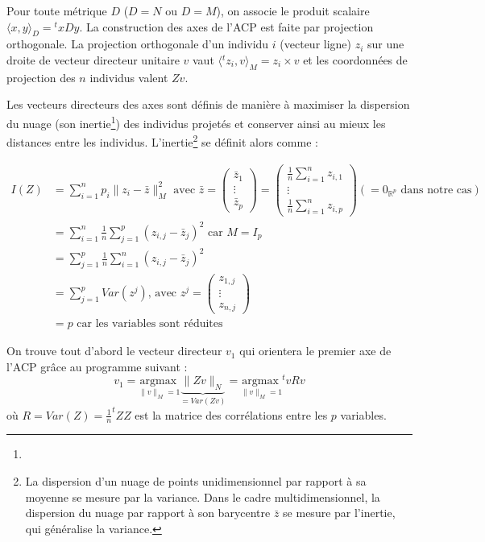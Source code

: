 \documentclass[11pt,french,french]{article}
\let\rmarkdownfootnote\footnote%
\def\footnote{\protect\rmarkdownfootnote}
\begin{document}
Pour toute métrique \(D\) (\(D=N\) ou \(D=M\)), on associe le produit scalaire \(\langle x,y\rangle_{D} = {}^t\!xD y\).
La construction des axes de l'ACP est faite par projection orthogonale.
La projection orthogonale d'un individu \(i\) (vecteur ligne) \(z_i\) sur une droite de vecteur directeur unitaire \(v\) vaut \(\langle {}^tz_i,v\rangle_{M}=z_i\times v\) et les coordonnées de projection des \(n\) individus valent \(Zv\).

Les vecteurs directeurs des axes sont définis de manière à maximiser la dispersion du nuage (son inertie\footnote{}) des individus projetés et conserver ainsi au mieux les distances entre les individus. L'inertie\footnote{La dispersion d'un nuage de points unidimensionnel par rapport à sa moyenne se mesure par la variance. Dans le cadre multidimensionnel, la dispersion du nuage par rapport à son barycentre \(\bar z\) se mesure par l'inertie, qui généralise la variance.} se définit alors comme :

\begin{align*}
I(Z) &= \sum_{i = 1}^n p_i\|z_i-\bar{z}\|_M^2 \text{ avec }
  \bar{z} = 
  \begin{pmatrix}\bar z_{1} \\
    \vdots \\ \bar z_{p}
  \end{pmatrix} =
  \begin{pmatrix}\frac 1 n \sum_{i=1}^n z_{i,1} \\
    \vdots \\ \frac 1 n \sum_{i=1}^n z_{i,p}
  \end{pmatrix} (= 0_{\mathbb R^p}\text{ dans notre cas})
\\&=\sum_{i = 1}^n \frac 1 n \sum_{j=1}^p (z_{i,j} -  \bar{z}_j)^2  \text{ car }M=I_p 
\\&=\sum_{j = 1}^p \frac 1 n \sum_{i=1}^n (z_{i,j} -  \bar{z}_j)^2
\\&=\sum_{j = 1}^p Var(z^j)\text{, avec } z^j = 
  \begin{pmatrix} z_{1,j} \\ \vdots \\  z_{n,j} 
  \end{pmatrix}
\\ &= p \text{ car les variables sont réduites}
\end{align*}

On trouve tout d'abord le vecteur directeur \(v_1\) qui orientera le premier axe de l'ACP grâce au programme suivant :
\[
v_1 =\underset{\| v \|_M = 1}{\mathrm{argmax~}} 
\underbrace{\|Zv\|_N}_{=Var(Zv)} =\underset{\| v \|_M = 1}{\mathrm{argmax~}} ^t\!vR v 
\]
où \(R = Var(Z) = \frac{1}{n} ^t\!Z Z\) est la matrice des corrélations entre les \(p\) variables.
\end{document}
